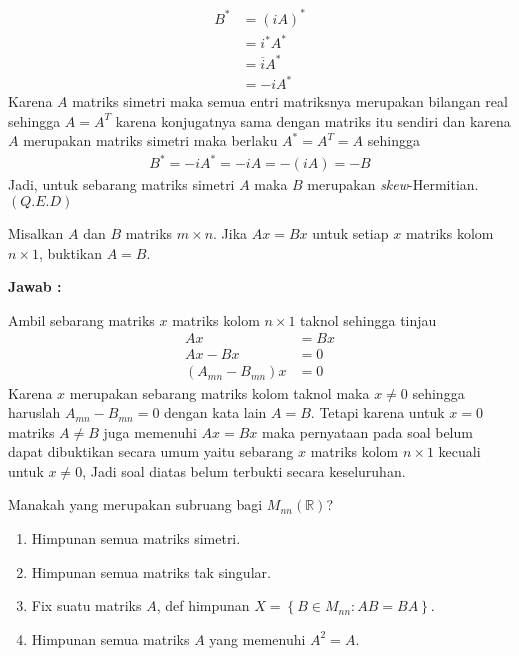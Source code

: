 \documentclass[11pt,a4paper]{article}
\theoremstyle{plain}
\theoremstyle{definition}
\theoremstyle{remark}
\begin{document}
\begin{enumerate}
\begin{enumerate}
\begin{enumerate}
\begin{align*}
			B^* &= (iA)^* \\
			&= i^* A^* \\
			&= \overline{i} A^* \\
			&= -i A^*			
			\end{align*}
			Karena $A$ matriks simetri maka semua entri matriksnya merupakan bilangan real sehingga $A=A^T$ karena konjugatnya sama dengan matriks itu sendiri dan karena $A$ merupakan matriks simetri maka berlaku $A^*=A^T=A$ sehingga
			\begin{align*}
			B^* = -iA^* = -iA = -(iA) =-B
			\end{align*} 
			Jadi, untuk sebarang matriks simetri $A$ maka $B$ merupakan \textit{skew}-Hermitian. $(Q.E.D)$ 
		\end{enumerate}
		
		
		
		\textbf{Jawab :}
		
		Ambil sebarang matriks $x$ matriks kolom $n\times 1$ taknol sehingga tinjau 
		\begin{align*}
		Ax &=Bx \\
		Ax-Bx &=0 \\
		(A_{mn}-B_{mn})x &=0	
		\end{align*}
		Karena $x$ merupakan sebarang matriks kolom taknol maka $x\ne 0$ sehingga haruslah $A_{mn}-B_{mn}=0$ dengan kata lain $A=B$. Tetapi karena untuk $x=0$ matriks $A\ne B$ juga memenuhi $Ax=Bx$ maka pernyataan pada soal belum dapat dibuktikan secara umum yaitu sebarang $x$ matriks kolom $n\times 1$ kecuali untuk $x\ne 0$, Jadi soal diatas belum terbukti secara keseluruhan.
		
		
		

\end{enumerate}
\end{enumerate}
\end{document}
